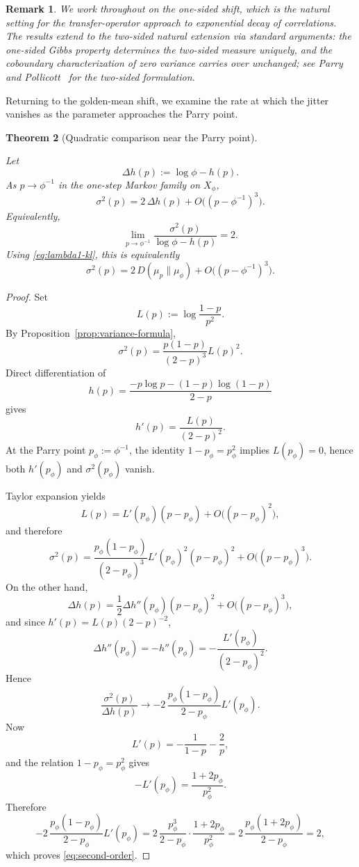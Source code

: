 \documentclass[pdflatex,sn-basic,Numbered]{sn-jnl}
\theoremstyle{thmstyleone}
\newtheorem{theorem}{Theorem}[section]
\theoremstyle{thmstyletwo}
\newtheorem{remark}[theorem]{Remark}
\theoremstyle{thmstylethree}
\newcommand{\leanverified}[1]{}
\begin{document}
\begin{remark}
We work throughout on the one-sided shift, which is the natural setting for the transfer-operator approach to exponential decay of correlations. The results extend to the two-sided natural extension via standard arguments: the one-sided Gibbs property determines the two-sided measure uniquely, and the coboundary characterization of zero variance carries over unchanged; see Parry and Pollicott~\cite{ParryPollicott1990} for the two-sided formulation.
\end{remark}

Returning to the golden-mean shift, we examine the rate at which the jitter vanishes as the parameter approaches the Parry point.

\begin{theorem}[Quadratic comparison near the Parry point]\label{thm:second-order}
\leanverified{paper_zero_jitter_second_order}
Let
\[
\Delta h(p):=\log\phi-h(p).
\]
As $p\to\phi^{-1}$ in the one-step Markov family on $X_\phi$,
\begin{equation}\label{eq:second-order}
\sigma^2(p)=2\,\Delta h(p)+O\bigl((p-\phi^{-1})^3\bigr).
\end{equation}
Equivalently,
\[
\lim_{p\to\phi^{-1}}\frac{\sigma^2(p)}{\log\phi-h(p)}=2.
\]
Using \eqref{eq:lambda1-kl}, this is equivalently
\[
\sigma^2(p)=2\,D(\mu_p\|\mu_\phi)+O\bigl((p-\phi^{-1})^3\bigr).
\]
\end{theorem}

\begin{proof}
Set
\[
L(p):=\log\frac{1-p}{p^2}.
\]
By Proposition~\ref{prop:variance-formula},
\[
\sigma^2(p)=\frac{p(1-p)}{(2-p)^3}L(p)^2.
\]
Direct differentiation of
\[
h(p)=\frac{-p\log p-(1-p)\log(1-p)}{2-p}
\]
gives
\[
h'(p)=\frac{L(p)}{(2-p)^2}.
\]
At the Parry point $p_\phi:=\phi^{-1}$, the identity $1-p_\phi=p_\phi^2$ implies $L(p_\phi)=0$, hence both $h'(p_\phi)$ and $\sigma^2(p_\phi)$ vanish.

Taylor expansion yields
\[
L(p)=L'(p_\phi)(p-p_\phi)+O\bigl((p-p_\phi)^2\bigr),
\]
and therefore
\[
\sigma^2(p)
=
\frac{p_\phi(1-p_\phi)}{(2-p_\phi)^3}L'(p_\phi)^2(p-p_\phi)^2
+O\bigl((p-p_\phi)^3\bigr).
\]
On the other hand,
\[
\Delta h(p)
=
\frac{1}{2}\Delta h''(p_\phi)(p-p_\phi)^2
+O\bigl((p-p_\phi)^3\bigr),
\]
and since $h'(p)=L(p)(2-p)^{-2}$,
\[
\Delta h''(p_\phi)=-h''(p_\phi)=-\frac{L'(p_\phi)}{(2-p_\phi)^2}.
\]
Hence
\[
\frac{\sigma^2(p)}{\Delta h(p)}
\to
-2\,\frac{p_\phi(1-p_\phi)}{2-p_\phi}L'(p_\phi).
\]
Now
\[
L'(p)=-\frac{1}{1-p}-\frac{2}{p},
\]
and the relation $1-p_\phi=p_\phi^2$ gives
\[
-L'(p_\phi)=\frac{1+2p_\phi}{p_\phi^2}.
\]
Therefore
\[
-2\,\frac{p_\phi(1-p_\phi)}{2-p_\phi}L'(p_\phi)
=
2\,\frac{p_\phi^3}{2-p_\phi}\cdot\frac{1+2p_\phi}{p_\phi^2}
=
2\,\frac{p_\phi(1+2p_\phi)}{2-p_\phi}
=
2,
\]
which proves \eqref{eq:second-order}.
\end{proof}
\end{document}
